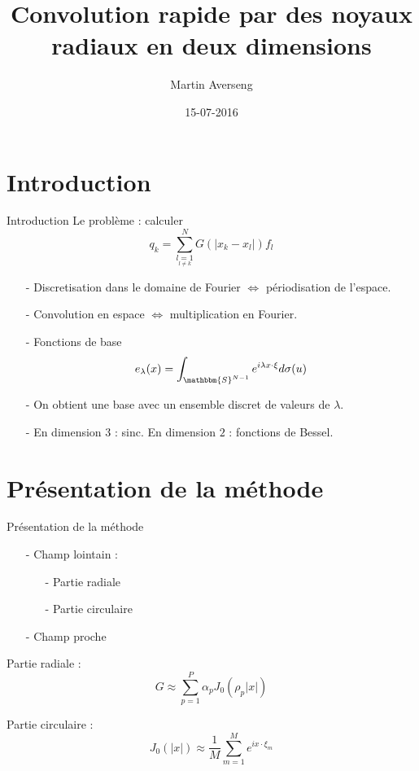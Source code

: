 \documentclass[11pt]{beamer}
\author{Martin Averseng}
\title{Convolution rapide par des noyaux radiaux en deux dimensions}
\institute{Ecole Polytechnique, Centre de Mathématiques Appliquées}
\date{15-07-2016}
\theoremstyle{plain}
\theoremstyle{definition}
\begin{document}
\begin{frame}
\titlepage
\end{frame}

\begin{frame}
\tableofcontents
\end{frame}

\section{Introduction}

\begin{frame}{Introduction}
Le problème : calculer 
\begin{equation*}
 q_k = \sum_{\underset{l\neq k}{l=1}}^N G(|x_k - x_l|)f_l 
\label{LaSommeACalculerDansLArticle}
\end{equation*}

\begin{itemize}

\item[-] Discretisation dans le domaine de Fourier $\iff$ périodisation de l'espace. 
\item[-] Convolution en espace $\iff$ multiplication en Fourier. 
\item[-] Fonctions de base 
\[e_\lambda(x) = \int_{\mathbbm{S}^{N-1}} e^{i\lambda x \cdot  \xi} d\sigma(u)\]
\item[-] On obtient une base avec un ensemble discret de valeurs de $\lambda$. 
\item[-] En dimension $3$ : sinc. En dimension $2$ : fonctions de Bessel. 
\end{itemize}
\end{frame}

\section{Présentation de la méthode}
\begin{frame}{Présentation de la méthode}
\begin{itemize}
\item[-] Champ lointain : \begin{itemize}
\item[-] Partie radiale
\item[-] Partie circulaire
\end{itemize}
\item[-] Champ proche 
\end{itemize}

Partie radiale : 
\begin{equation*}
G \approx \sum_{p=1}^P \alpha_p J_0(\rho_p |x|)
\label{GasASumOfJ0}
\end{equation*}

Partie circulaire : 
\[J_0(|x|) \approx \frac{1}{M}\sum_{m=1}^M e^{i x \cdot \xi_m}\] 


\end{frame}
\end{document}
